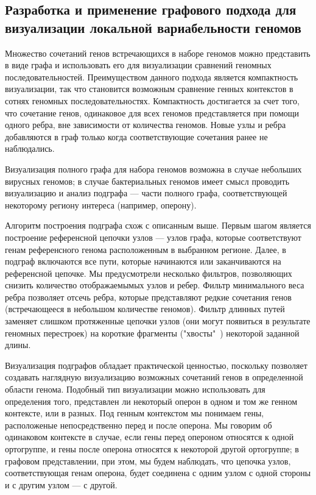 \subsection*{Разработка и применение графового подхода для визуализации локальной вариабельности геномов}

Множество сочетаний генов встречающихся в наборе геномов можно представить в виде графа и использовать его для визуализации сравнений геномных последовательностей. Преимуществом данного подхода является компактность визуализации, так что становится возможным сравнение генных контекстов в сотнях геномных последовательностях. Компактность достигается за счет того, что сочетание генов, одинаковое для всех геномов представляется при помощи одного ребра, вне зависимости от количества геномов. Новые узлы и ребра добавляются в граф только когда соответствующие сочетания ранее не наблюдались. 

Визуализация полного графа для набора геномов возможна в случае небольших вирусных геномов; в случае бактериальных геномов имеет смысл проводить визуализацию и анализ подграфа --- части полного графа, соответствующей некоторому региону интереса (например, оперону).

Алгоритм построения подграфа схож с описанным выше. Первым шагом является построение референсной цепочки узлов --- узлов графа, которые соответствуют генам референсного генома расположенным в выбранном регионе. Далее, в подграф включаются все пути, которые начинаются или заканчиваются на референсной цепочке. Мы предусмотрели несколько фильтров, позволяющих снизить количество отображаемымых узлов и ребер. Фильтр минимального веса ребра позволяет отсечь ребра, которые представляют редкие сочетания генов (встречающееся в небольшом количестве геномов). Фильтр длинных путей заменяет слишком протяженные цепочки узлов (они могут появиться в результате геномных перестроек) на короткие фрагменты ("хвосты"\ ) некоторой заданной длины. 

Визуализация подграфов обладает практической ценностью, поскольку позволяет создавать наглядную визуализацию возможных сочетаний генов в определенной области генома. Подобный тип визуализации можно использовать для определения того, представлен ли некоторый оперон в одном и том же генном контексте, или в разных. Под генным контекстом мы понимаем гены, расположеные непосредственно перед и после оперона. Мы говорим об одинаковом контексте в случае, если гены перед опероном относятся к одной ортогруппе, и гены после оперона относятся к некоторой другой ортогруппе; в графовом представлении, при этом, мы будем наблюдать, что цепочка узлов, соответствующая генам оперона, будет соединена с одним узлом с одной стороны и с другим узлом --- с другой. 


